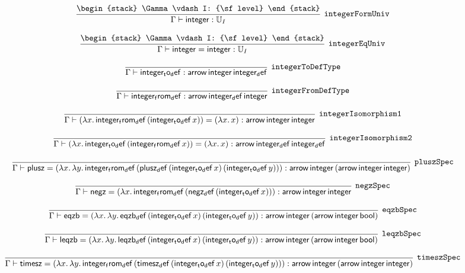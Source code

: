 \[
\infer[{\tt integerFormUniv}]{\Gamma \vdash {\sf integer}: {\Bbb U}_{I}}{
\begin{stack}
\Gamma \vdash I: {\sf level}
\end{stack}}
\]

\[
\infer[{\tt integerEqUniv}]{\Gamma \vdash {\sf integer}= {\sf integer}: {\Bbb U}_{I}}{
\begin{stack}
\Gamma \vdash I: {\sf level}
\end{stack}}
\]

\[
\infer[{\tt integerToDefType}]{\Gamma \vdash {\sf integer_to_def}: {\sf arrow}\,{\sf integer}\,{\sf integer_def}}{}
\]

\[
\infer[{\tt integerFromDefType}]{\Gamma \vdash {\sf integer_from_def}: {\sf arrow}\,{\sf integer_def}\,{\sf integer}}{}
\]

\[
\infer[{\tt integerIsomorphism1}]{\Gamma \vdash (\lambda x.\,{\sf integer_from_def}\,({\sf integer_to_def}\,x))= (\lambda x.\,x): {\sf arrow}\,{\sf integer}\,{\sf integer}}{}
\]

\[
\infer[{\tt integerIsomorphism2}]{\Gamma \vdash (\lambda x.\,{\sf integer_to_def}\,({\sf integer_from_def}\,x))= (\lambda x.\,x): {\sf arrow}\,{\sf integer_def}\,{\sf integer_def}}{}
\]

\[
\infer[{\tt pluszSpec}]{\Gamma \vdash {\sf plusz}= (\lambda x.\,\lambda y.\,{\sf integer_from_def}\,({\sf plusz_def}\,({\sf integer_to_def}\,x)\,({\sf integer_to_def}\,y))): {\sf arrow}\,{\sf integer}\,({\sf arrow}\,{\sf integer}\,{\sf integer})}{}
\]

\[
\infer[{\tt negzSpec}]{\Gamma \vdash {\sf negz}= (\lambda x.\,{\sf integer_from_def}\,({\sf negz_def}\,({\sf integer_to_def}\,x))): {\sf arrow}\,{\sf integer}\,{\sf integer}}{}
\]

\[
\infer[{\tt eqzbSpec}]{\Gamma \vdash {\sf eqzb}= (\lambda x.\,\lambda y.\,{\sf eqzb_def}\,({\sf integer_to_def}\,x)\,({\sf integer_to_def}\,y)): {\sf arrow}\,{\sf integer}\,({\sf arrow}\,{\sf integer}\,{\sf bool})}{}
\]

\[
\infer[{\tt leqzbSpec}]{\Gamma \vdash {\sf leqzb}= (\lambda x.\,\lambda y.\,{\sf leqzb_def}\,({\sf integer_to_def}\,x)\,({\sf integer_to_def}\,y)): {\sf arrow}\,{\sf integer}\,({\sf arrow}\,{\sf integer}\,{\sf bool})}{}
\]

\[
\infer[{\tt timeszSpec}]{\Gamma \vdash {\sf timesz}= (\lambda x.\,\lambda y.\,{\sf integer_from_def}\,({\sf timesz_def}\,({\sf integer_to_def}\,x)\,({\sf integer_to_def}\,y))): {\sf arrow}\,{\sf integer}\,({\sf arrow}\,{\sf integer}\,{\sf integer})}{}
\]

